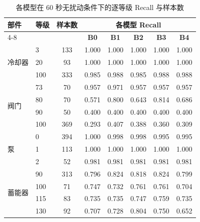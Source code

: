 \documentclass[12pt, a4paper]{ctexart}
\begin{document}
\begin{table}[H]
    \centering
    \caption{各模型在 60 秒无扰动条件下的逐等级 Recall 与样本数}
    \label{tab:recall_per_class}
    \small
    \setlength{\tabcolsep}{6pt}
    \begin{tabular}{llcccccc}
        \toprule
        \multirow{2}{*}{\textbf{部件}} & \multirow{2}{*}{\textbf{等级}} & \multirow{2}{*}{\textbf{样本数}} & \multicolumn{5}{c}{\textbf{各模型 Recall}} \\
        \cmidrule(lr){4-8}
        & & & \textbf{B0} & \textbf{B1} & \textbf{B2} & \textbf{B3} & \textbf{B4} \\
        \midrule
        \multirow{3}{*}{冷却器} & 3   & 133 & 1.000 & 1.000 & 1.000 & 1.000 & 1.000 \\
                                & 20  &  93 & 1.000 & 1.000 & 1.000 & 1.000 & 1.000 \\
                                & 100 & 333 & 0.985 & 0.988 & 0.985 & 0.988 & 0.988 \\
        \midrule
        \multirow{4}{*}{阀门} & 73  &  70 & 0.957 & 0.971 & 0.957 & 0.957 & 0.957 \\
                              & 80  &  70 & 0.571 & 0.800 & 0.643 & 0.814 & 0.686 \\
                              & 90  &  50 & 0.400 & 0.400 & 0.400 & 0.400 & 0.400 \\
                              & 100 & 369 & 0.293 & 0.407 & 0.388 & 0.360 & 0.309 \\
        \midrule
        \multirow{3}{*}{泵} & 0   & 394 & 1.000 & 0.998 & 0.998 & 0.995 & 0.995 \\
                            & 1   & 113 & 1.000 & 1.000 & 1.000 & 1.000 & 1.000 \\
                            & 2   &  52 & 0.981 & 0.981 & 0.981 & 0.981 & 0.981 \\
        \midrule
        \multirow{4}{*}{蓄能器} & 90  & 313 & 0.796 & 0.824 & 0.818 & 0.824 & 0.799 \\
                                & 100 &  71 & 0.747 & 0.732 & 0.761 & 0.761 & 0.704 \\
                                & 115 &  83 & 0.735 & 0.735 & 0.747 & 0.759 & 0.735 \\
                                & 130 &  92 & 0.707 & 0.728 & 0.804 & 0.750 & 0.652 \\
        \bottomrule
    \end{tabular}
\end{table}
\end{document}
